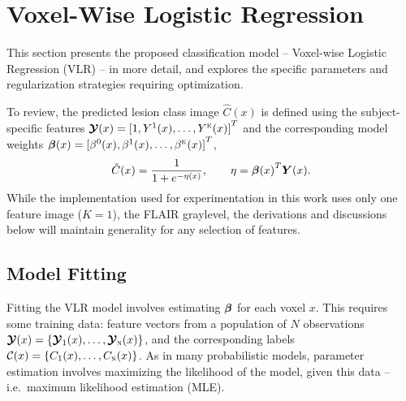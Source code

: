 \chapter{Voxel-Wise Logistic Regression}\label{ch-vlr}
This section presents the proposed classification model
-- Voxel-wise Logistic Regression (VLR) --
in more detail, and explores the specific parameters and regularization strategies
requiring optimization.
\par
To review, the predicted lesion class image $\hat{C}(x)$ is defined
using the subject-specific features $\bm{\mathcal{Y}}(x) = {[1,Y^1(x),\dots,Y^{\textsc{k}}(x)]}^T$
and the corresponding model weights $\bm{\beta}(x) = {[\beta^0(x),\beta^1(x),\dots,\beta^{\textsc{k}}(x)]}^T$,
\begin{equation}
  \hat{C}(x) = \frac{1}{1+e^{-\eta(x)}},\qquad\eta = {\bb(x)}^T\bm{Y}(x).%
  \label{eq:eq:vlrmodel}
\end{equation}
While the implementation used for experimentation in this work
uses only one feature image ($K=1$), the FLAIR graylevel,
the derivations and discussions below will maintain generality for any selection of features.
\section{Model Fitting}\label{ss:modelfitting}
Fitting the VLR model involves estimating $\bm{\beta}$ for each voxel $x$.
This requires some training data:
feature vectors from a population of $N$ observations $\bm{\mathcal{Y}}(x) = \{\bm{\mathcal{Y}}_1(x),\dots,\bm{\mathcal{Y}}_{\textsc{n}}(x)\}$,
and the corresponding labels $\mathcal{C}(x) = \{C_1(x),\dots,C_{\textsc{n}}(x)\}$.
As in many probabilistic models,
parameter estimation involves maximizing the likelihood of the model, given this data --
i.e.\ maximum likelihood estimation (MLE).
